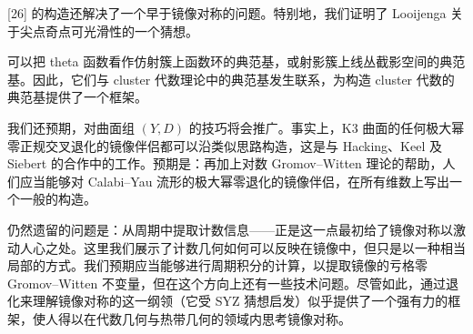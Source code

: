 [26] 的构造还解决了一个早于镜像对称的问题。特别地，我们证明了 Looijenga 关于尖点奇点可光滑性的一个猜想。

可以把 theta 函数看作仿射簇上函数环的典范基，或射影簇上线丛截影空间的典范基。因此，它们与 cluster 代数理论中的典范基发生联系，为构造 cluster 代数的典范基提供了一个框架。

我们还预期，对曲面组 $(Y,D)$ 的技巧将会推广。事实上，K3 曲面的任何极大幂零正规交叉退化的镜像伴侣都可以沿类似思路构造，这是与 Hacking、Keel 及 Siebert 的合作中的工作。预期是：再加上对数 Gromov--Witten 理论的帮助，人们应当能够对 Calabi--Yau 流形的极大幂零退化的镜像伴侣，在所有维数上写出一个一般的构造。

仍然遗留的问题是：从周期中提取计数信息------正是这一点最初给了镜像对称以激动人心之处。这里我们展示了计数几何如何可以反映在镜像中，但只是以一种相当局部的方式。我们预期应当能够进行周期积分的计算，以提取镜像的亏格零 Gromov--Witten 不变量，但在这个方向上还有一些技术问题。尽管如此，通过退化来理解镜像对称的这一纲领（它受 SYZ 猜想启发）似乎提供了一个强有力的框架，使人得以在代数几何与热带几何的领域内思考镜像对称。
